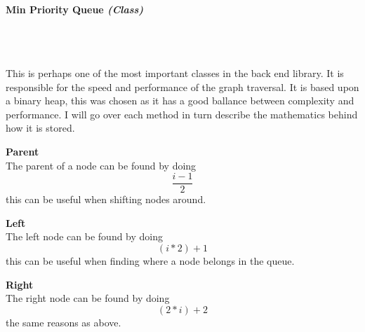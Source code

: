 \begin{FlushLeft}
    \bk
    
    \pagebreak
\paragraph{Min Priority Queue \textit{(Class)}} \mbox{} \\

    \begin{figure}[H]
        \centering
    \end{figure}\\

    This is perhaps one of the most important classes in the back end library. It is responsible for the speed and performance of the graph traversal. It is based upon a binary heap, this was chosen as it has a good ballance between complexity and performance. I will go over each method in turn describe the mathematics behind how it is stored. \\ \bk

    \textbf{Parent} \\ \bk
    The parent of a node can be found by doing $$ \frac{i - 1}{2}$$ this can be useful when shifting nodes around. \\ \bk

    \textbf{Left} \\ \bk
    The left node can be found by doing $$ (i * 2) + 1$$ this can be useful when finding where a node belongs in the queue.\\ \bk

    \textbf{Right} \\ \bk
    The right node can be found by doing $$ (2 * i) + 2$$ the same reasons as above. \\ \bk


\end{FlushLeft}
